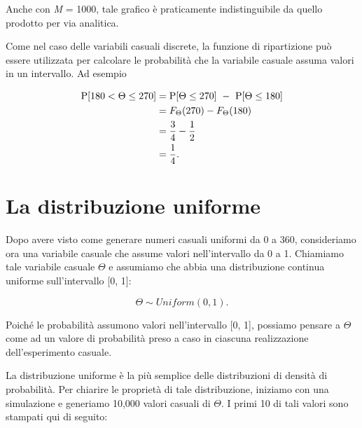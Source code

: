 \documentclass[
  11pt,
]{krantz}
\theoremstyle{definition}
\theoremstyle{definition}
\theoremstyle{definition}
\theoremstyle{definition}
\theoremstyle{remark}
\begin{document}
Anche con \emph{M} = 1000, tale grafico è praticamente indistinguibile da quello prodotto per via analitica.

Come nel caso delle variabili casuali discrete, la funzione di ripartizione può essere utilizzata per calcolare le probabilità che la variabile casuale assuma valori in un intervallo. Ad esempio

\begin{align}
\mbox{P}[180 < \Theta \leq 270] &= \mbox{P}[\Theta \leq 270] \ - \ \mbox{P}[\Theta \leq 180] \notag\\
&= F_{\Theta}(270) - F_{\Theta}(180)\notag\\
&= \frac{3}{4} - \frac{1}{2} \notag\\
&= \frac{1}{4}.\noindent
\end{align}

\hypertarget{la-distribuzione-uniforme}{%
\section{La distribuzione uniforme}\label{la-distribuzione-uniforme}}

Dopo avere visto come generare numeri casuali uniformi da 0 a 360, consideriamo ora una variabile casuale che assume valori nell'intervallo da 0 a 1. Chiamiamo tale variabile casuale \(\Theta\) e assumiamo che abbia una distribuzione continua uniforme sull'intervallo {[}0, 1{]}:

\[
\Theta \sim Uniform(0, 1).
\]

Poiché le probabilità assumono valori nell'intervallo {[}0, 1{]}, possiamo pensare a \(\Theta\) come ad un valore di probabilità preso a caso in ciascuna realizzazione dell'esperimento casuale.

La distribuzione uniforme è la più semplice delle distribuzioni di densità di probabilità. Per chiarire le proprietà di tale distribuzione, iniziamo con una simulazione e generiamo 10,000 valori casuali di \(\Theta\). I primi 10 di tali valori sono stampati qui di seguito:
\end{document}
